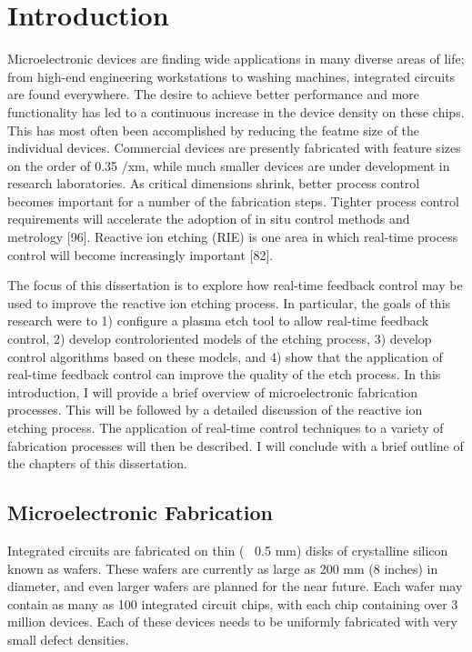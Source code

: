 \chapter{Introduction}

\tab Microelectronic devices are finding wide applications in many diverse areas of life; from
high-end engineering workstations to washing machines, integrated circuits are found everywhere. The desire to achieve better performance and more functionality has led to a
continuous increase in the device density on these chips. This has most often been accomplished by reducing the featme size of the individual devices. Commercial devices are
presently fabricated with feature sizes on the order of 0.35 /xm, while much smaller devices are under development in research laboratories. As critical dimensions shrink, better
process control becomes important for a number of the fabrication steps. Tighter process
control requirements will accelerate the adoption of in situ control methods and metrology
[96]. Reactive ion etching (RIE) is one area in which real-time process control will become
increasingly important [82].


\tab The focus of this dissertation is to explore how real-time feedback control may be used
to improve the reactive ion etching process. In particular, the goals of this research were
to 1) configure a plasma etch tool to allow real-time feedback control, 2) develop controloriented models of the etching process, 3) develop control algorithms based on these models,
and 4) show that the application of real-time feedback control can improve the quality of the etch process. In this introduction, I will provide a brief overview of microelectronic
fabrication processes. This will be followed by a detailed discussion of the reactive ion
etching process. The application of real-time control techniques to a variety of fabrication
processes will then be described. I will conclude with a brief outline of the chapters of this
dissertation.


\section{Microelectronic Fabrication}

\tab Integrated circuits are fabricated on thin (~ 0.5 mm) disks of crystalline silicon known
as wafers. These wafers are currently as large as 200 mm (8 inches) in diameter, and even
larger wafers are planned for the near future. Each wafer may contain as many as 100
integrated circuit chips, with each chip containing over 3 million devices. Each of these
devices needs to be uniformly fabricated with very small defect densities.


